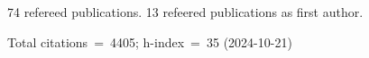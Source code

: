 74 refereed publications. 13 refeered publications as first author.

Total citations~=~4405; h-index~=~35 (2024-10-21)